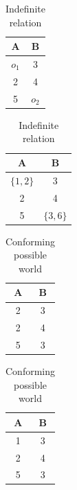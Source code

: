 {\line
\begin{table}[ht]
\begin{minipage}[b]{7cm}
\begin{center}
\begin{tabular}{|c|c|} \hline
A & B  \\ \hline
$o_1$ & 3  \\
2 & 4  \\
5 & $o_2$  \\ \hline
\end{tabular}
\end{center}
\caption{\label{tbl:orobj} OR-object indefinite relation} 
\end{minipage}
\hfill
\begin{minipage}[b]{7cm}
\begin{center}
\begin{tabular}{|c|c|} \hline
A & B  \\ \hline
$\{1,2\}$ & 3  \\
2 & 4  \\
5 & $\{3,6\}$  \\ \hline
\end{tabular}
\end{center}
\caption{\label{tbl:indef1} Indefinite relation} 
\end{minipage}
\end{table}
\begin{table}[ht]
\begin{minipage}[b]{7cm}
\begin{center}
\begin{tabular}{|c|c|} \hline
A & B  \\ \hline
2 & 3  \\
2 & 4  \\
5 & 3  \\ \hline
\end{tabular}
\end{center}
\caption{\label{tbl:noncon1} Non-conforming possible world} 
\end{minipage}
\hfill
\begin{minipage}[b]{7cm}
\begin{center}
\begin{tabular}{|c|c|} \hline
A & B  \\ \hline
1 & 3  \\
2 & 4  \\
5 & 3  \\ \hline
\end{tabular}
\end{center}
\caption{\label{tbl:conform1} Conforming possible world} 
\end{minipage}
\end{table}
}


